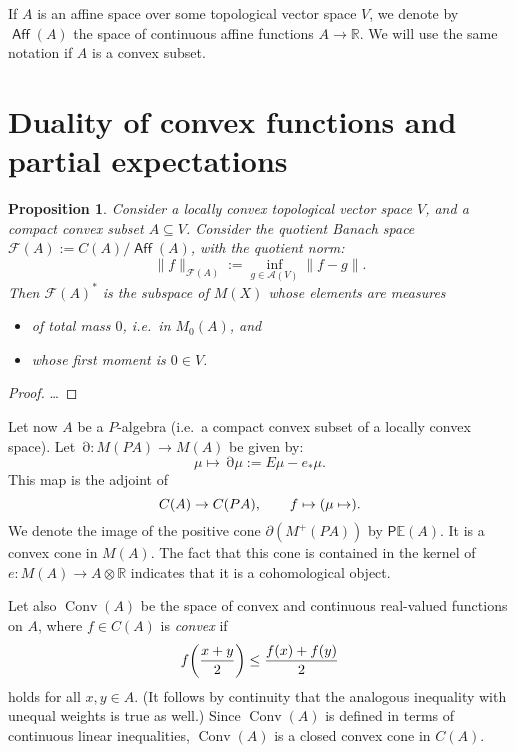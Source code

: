\documentclass[a4paper,12pt]{scrartcl}
\numberwithin{equation}{section}
\theoremstyle{plain}
\newtheorem{prop}[thm]{Proposition}
\theoremstyle{definition}
\DeclareMathOperator{\Aff}{\mathsf{Aff}} %
\newcommand{\R}{\mathbb{R}}
\DeclareMathOperator{\1}{\mathbbm{1}}
\DeclareMathOperator{\2}{\mathbbm{2}}
\newcommand{\E}{\mathbb{E}}
\DeclareMathOperator{\D}{\partial}
\newcommand{\PCM}{\mathsf{P}\E} %
\let\originalleft\left
\let\originalright\right
\renewcommand{\left}{\mathopen{}\mathclose\bgroup\originalleft}
\renewcommand{\right}{\aftergroup\egroup\originalright}
\begin{document}
If $A$ is an affine space over some topological vector space $V$, we denote by $\Aff(A)$ the space of continuous affine functions $A\to\R$. We will use the same notation if $A$ is a convex subset.

\section{Duality of convex functions and partial expectations}

\begin{prop}
 Consider a locally convex topological vector space $V$, and a compact convex subset $A\subseteq V$. Consider the quotient Banach space $\mathcal{F}(A):=C(A)/\Aff(A)$, with the quotient norm:
 \begin{equation}
  \|f\|_{\mathcal{F}(A)}:=\inf_{g\in\mathcal{A}(V)} \|f-g\|.
 \end{equation}
 Then $\mathcal{F}(A)^*$ is the subspace of $M(X)$ whose elements are measures
 \begin{itemize}
  \item of total mass $0$, i.e.~in $M_0(A)$, and
  \item whose first moment is $0\in V$.
 \end{itemize}
\end{prop}

\begin{proof}
\ldots
\end{proof}

Let now $A$ be a $P$-algebra (i.e.~a compact convex subset of a locally convex space). Let $\D:M(PA)\to M(A)$ be given by:
\begin{equation}
 \mu \mapsto \D\mu := E\mu - e_*\mu .
\end{equation}
This map is the adjoint of
\[
	C(A) \to C(PA), \qquad f\mapsto \left(\mu \mapsto \right).
\]
We denote the image of the positive cone $\partial(M^+(PA))$ by $\PCM(A)$. It is a convex cone in $M(A)$. The fact that this cone is contained in the kernel of $e : M(A) \to A\otimes\R$ indicates that it is a cohomological object.

Let also $\operatorname{Conv}(A)$ be the space of convex and continuous real-valued functions on $A$, where $f\in C(A)$ is \emph{convex} if
\[
	f\left(\frac{x + y}{2}\right) \leq \frac{f(x) + f(y)}{2}	
\]
holds for all $x,y\in A$. (It follows by continuity that the analogous inequality with unequal weights is true as well.) Since $\operatorname{Conv}(A)$ is defined in terms of continuous linear inequalities, $\operatorname{Conv}(A)$ is a closed convex cone in $C(A)$.
\end{document}
